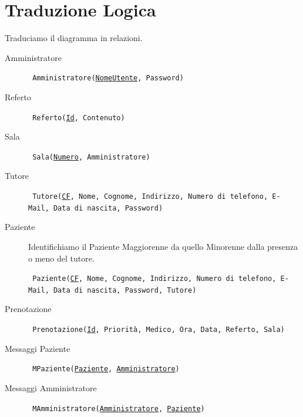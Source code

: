 \section{Traduzione Logica}
Traduciamo il diagramma in relazioni.
\begin{description}

\item[Amministratore] 
\begin{center}
\texttt{
Amministratore(\uline{NomeUtente}, Password)
}
\end{center}

\item[Referto] 
\begin{center}
\texttt{
Referto(\uline{Id}, Contenuto)
}
\end{center}

\item[Sala] 
\begin{center}
\texttt{
Sala(\uline{Numero}, Amministratore)
}
\end{center}

\item[Tutore] 
\begin{center}
\texttt{
Tutore(\uline{CF}, Nome, Cognome, Indirizzo, Numero di telefono, E-Mail, Data di nascita,
	Password)
}
\end{center}

\item[Paziente] Identifichiamo il Paziente Maggiorenne da quello Minorenne dalla
	presenza o meno del tutore.
\begin{center}
\texttt{
Paziente(\uline{CF}, Nome, Cognome, Indirizzo, Numero di telefono, E-Mail, Data di nascita,
	Password, Tutore)
}
\end{center}

\item[Prenotazione] 
\medskip

\begin{center}
\texttt{
Prenotazione(\uline{Id}, Priorità, Medico, Ora, Data, Referto, Sala)
}
\end{center}

\item[Messaggi Paziente] 
\begin{center}
\texttt{
MPaziente(\uline{Paziente}, \uline{Amministratore})
}
\end{center}

\item[Messaggi Amministratore] 
\begin{center}
\texttt{
MAmministratore(\uline{Amministratore}, \uline{Paziente})
}
\end{center}

\end{description}

